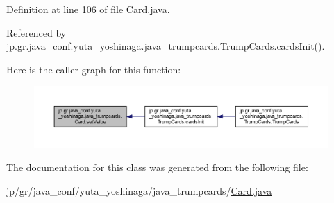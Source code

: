 Definition at line 106 of file Card.\+java.



Referenced by jp.\+gr.\+java\+\_\+conf.\+yuta\+\_\+yoshinaga.\+java\+\_\+trumpcards.\+Trump\+Cards.\+cards\+Init().

Here is the caller graph for this function\+:
\nopagebreak
\begin{figure}[H]
\begin{center}
\leavevmode
\includegraphics[width=350pt]{classjp_1_1gr_1_1java__conf_1_1yuta__yoshinaga_1_1java__trumpcards_1_1_card_a64976287ff631099e8cde6717b1611c6_icgraph}
\end{center}
\end{figure}


The documentation for this class was generated from the following file\+:\begin{DoxyCompactItemize}
\item 
jp/gr/java\+\_\+conf/yuta\+\_\+yoshinaga/java\+\_\+trumpcards/\hyperlink{_card_8java}{Card.\+java}\end{DoxyCompactItemize}
